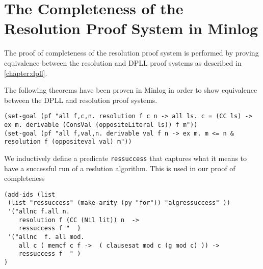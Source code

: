 \section{The Completeness of the Resolution Proof System in Minlog}
The proof of completeness of the resolution proof system is performed by proving equivalence between the resolution and DPLL proof systems as described in \ref{chapter:dpll}.  
\begin{comment}
\begin{center}
\texttt{(set-goal  (pf "all f,c. all c0,n. resolution f c n  -> (memcf c0 f -> F) -> resolution (conccf c0 f) c n "))}
\end{center}

\begin{center}
\texttt{(set-goal (pf "all f,c. all c0,l0,n.  resolution f c n -> memcf c0 f -> ex m. m <= n +1 \& resolution (conccf(inslc  l0 c0)   (remcf c0 f)) (inslc l0 c) m "))}
\end{center}
\end{comment}

The following theorems have been proven in Minlog in order to show equivalence between the DPLL and resolution proof systems. 
\begin{center}
\texttt{(set-goal (pf "all f,c,n. resolution f c n -> all ls. c = (CC ls) -> ex m.  derivable (ConsVal (oppositeLiteral ls)) f m"))} \\
\texttt{(set-goal (pf "all f,val,n. derivable val f n -> ex m. m <= n \& resolution f (oppositeval val) m"))}
\end{center}

We inductively define a predicate \texttt{ressuccess} that captures what it means to have a successful run of a reslution algorithm. This is used in our proof of completeness 

\begin{lstlisting}
(add-ids (list 
 (list "ressuccess" (make-arity (py "for")) "algressuccess" ))
 '("allnc f.all n.                                                                                                                                           
    resolution f (CC (Nil lit)) n  ->                                                                                                    
    ressuccess f "  )
 '("allnc  f. all mod.                                                                                                                                 
    all c ( memcf c f ->  ( clausesat mod c (g mod c) )) ->                                                                
    ressuccess f  " )
)
\end{lstlisting}


